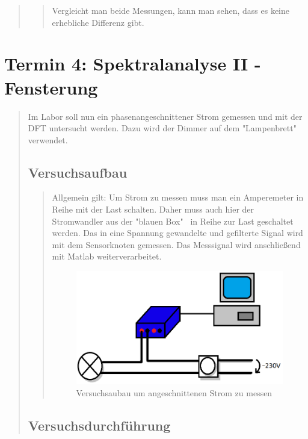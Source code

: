 \begin{quote}
\begin{quote}
	Vergleicht man beide Messungen, kann man sehen, dass es keine erhebliche
	Differenz gibt.
	
	 
	\end{quote}
\end{quote}

\section{Termin 4: Spektralanalyse II - Fensterung}
\begin{quote}

	Im Labor soll nun ein phasenangeschnittener Strom gemessen und mit der DFT untersucht werden.
	Dazu wird der Dimmer auf dem "Lampenbrett" verwendet.
	
	\subsection{Versuchsaufbau}
	\begin{quote}
    	Allgemein gilt: Um Strom zu messen muss man ein Amperemeter in Reihe mit der Last schalten. 
    	Daher muss auch hier der Stromwandler aus der "blauen Box" \ in Reihe zur Last geschaltet 
    	werden. Das in eine Spannung gewandelte und gefilterte Signal wird mit dem Sensorknoten gemessen. 
    	Das Messsignal wird anschließend mit Matlab weiterverarbeitet.
    
    	\begin{figure}[htb]
        	\centering
        	\includegraphics[scale=0.6,  trim = 0cm 0cm 0cm 0cm,clip]{./Bilder/Versuchsaufbau1}
        	\caption{Versuchsaubau um angeschnittenen Strom zu messen}
    	\end{figure}	
	\end{quote}
	
	\subsection{Versuchsdurchführung}
	\begin{quote}
		        

\end{quote}
\end{quote}
